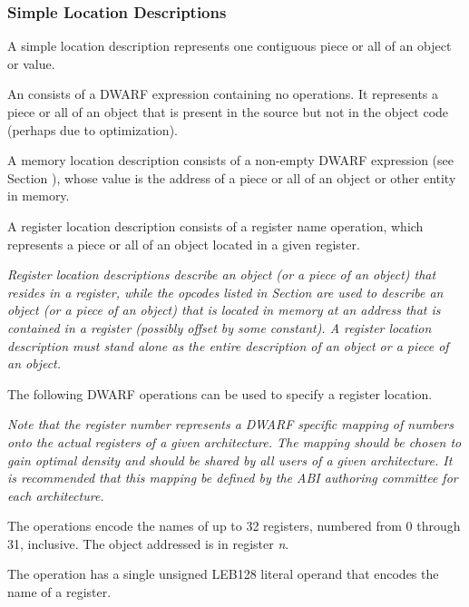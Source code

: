 \subsubsection{Simple Location Descriptions}
\label{chap:simplelocationdesriptions}
A 
simple location description 
\bb
represents
\eb
one contiguous piece or all of an object or value.

\label{chap:emptylocationdescriptions}
An 
consists of a DWARF expression
containing no operations. It represents a piece or all of an
object that is present in the source but not in the object code
(perhaps due to optimization).

\label{chap:memorylocationdescriptions}
A 
memory location description 
consists of a non-empty DWARF
expression (see 
Section ), 
whose value is the address of
a piece or all of an object or other entity in memory.

\label{chap:registerlocationdescriptions}
A register location description consists of a register name
operation, which represents a piece or all of an object
located in a given register.

\textit{Register location descriptions describe an object
(or a piece of an object) that resides in a register, while
the opcodes listed in 
Section 
are used to describe an object (or a piece of
an object) that is located in memory at an address that is
contained in a register (possibly offset by some constant). A
register location description must stand alone as the entire
description of an object or a piece of an object.
}

The following DWARF operations can be used to 
specify a register location.

\textit{Note that the register number represents a DWARF specific
mapping of numbers onto the actual registers of a given
architecture. The mapping should be chosen to gain optimal
density and should be shared by all users of a given
architecture. It is recommended that this mapping be defined
by the ABI authoring committee for each architecture.
}
\begin{enumerate}[1. ]
The \DWOPregnTARG{} operations encode the names of up to 32
registers, numbered from 0 through 31, inclusive. The object
addressed is in register \textit{n}.

\itembfnl{\DWOPregxTARG}
The \DWOPregxNAME{} operation has a single 
unsigned LEB128 literal
operand that encodes the name of a register.  

\end{enumerate}


